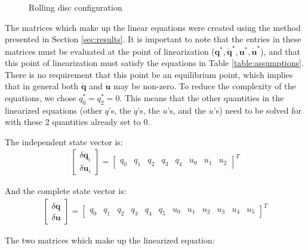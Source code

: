 \documentclass[smallcondensed]{svjour3}                     %
\begin{document}
\begin{figure}
  \centering
  
  \caption{Rolling disc configuration}
  \label{fig:disc}
\end{figure}



The matrices which make up the linear equations were created using the method
presented in Section \ref{sec:results}. It is important to note that the
entries in these matrices must be evaluated at the point of linearization
($\bm{q}^*, \bm{\dot{q}}^*, \bm{u}^*, \bm{\dot{u}}^*$), and that this point of
linearization must satisfy the equations in Table \ref{table:assumptions}.
There is no requirement that this point be an equilibrium point, which implies
that in general both $\bm{\dot{q}}$ and $\bm{\dot{u}}$ may be non-zero. To
reduce the complexity of the equations, we chose $q_0^* = q_2^* = 0$.  This
means that the other quantities in the linearized equations (other $q$'s, the
$\dot{q}$'s, the $u$'s, and the $\dot{u}$'s) need to be solved for with these 2
quantities already set to 0.

The independent state vector is:
\begin{align}
\begin{bmatrix}
\delta \bm{q}_i \\
\delta \bm{u}_i
\end{bmatrix} =
\begin{bmatrix}
q_0 &
q_1 &
q_2 &
q_3 &
q_4 &
u_0 &
u_1 &
u_2
\end{bmatrix}^T
\end{align}

And the complete state vector is:
\begin{align}
\begin{bmatrix}
\delta \bm{q} \\
\delta \bm{u}
\end{bmatrix} =
\left[
\begin{array}{cccccccccccc}
q_0 &
q_1 &
q_2 &
q_3 &
q_4 &
q_5 &
u_0 &
u_1 &
u_2 &
u_3 &
u_4 &
u_5
\end{array}
\right]^T
\end{align}

The two matrices which make up the linearized equation:
\end{document}
